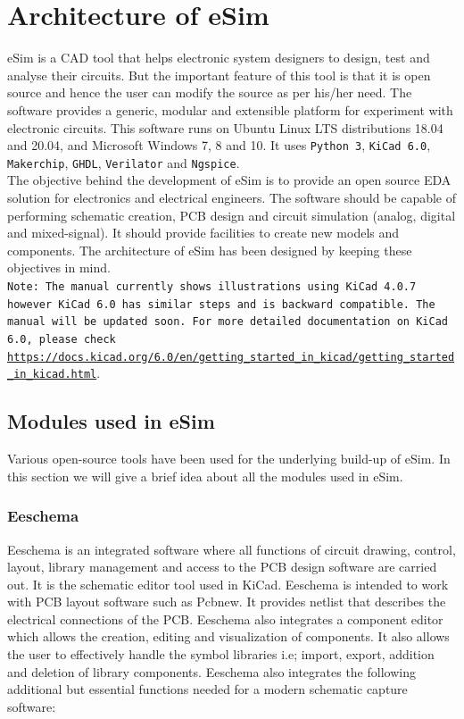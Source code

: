 
\chapter {Architecture of eSim}
\thispagestyle{empty}
\label{chap2}

eSim is a CAD  tool that helps electronic system designers
to design, test and analyse their circuits. But the important feature
of this tool is that it is open source and hence the user can modify
the source as per his/her need. The software provides a generic,
modular and extensible platform for experiment with electronic
circuits. This software runs on Ubuntu Linux LTS distributions 18.04 and 20.04, and  Microsoft Windows 7, 8 and 10.
It uses {\tt Python 3}, {\tt KiCad 6.0}, {\tt Makerchip},
{\tt GHDL}, {\tt Verilator} and {\tt Ngspice}.\\


The objective behind the development of eSim is to provide an open
source EDA solution for electronics and electrical engineers. The 
software should be capable of performing schematic creation, PCB 
design and circuit simulation (analog, digital and mixed-signal). 
It should provide facilities to create new models and components. 
The architecture of eSim has been designed by keeping these 
objectives in mind. \\

{\tt Note: The manual currently shows illustrations using KiCad 4.0.7 however KiCad 6.0 has similar steps and is backward compatible. The manual will be updated soon. For more detailed documentation on KiCad 6.0, please check \url{https://docs.kicad.org/6.0/en/getting_started_in_kicad/getting_started_in_kicad.html}}.

\section {Modules used in eSim}
Various open-source tools have been used for the underlying build-up 
of eSim. In this section we will give a brief idea about all the modules  
used in eSim. 

\subsection {Eeschema}  
Eeschema is an integrated software where all functions of circuit
drawing, control, layout, library management and access to the PCB
design software are carried out.  It is the schematic
editor tool used in KiCad. %
Eeschema is intended to
work with PCB layout software such as Pcbnew. It provides netlist that
describes the electrical connections of the PCB. Eeschema also
integrates a component editor which allows the creation, editing and
visualization of components. It also allows the user to effectively
handle the symbol libraries i.e; import, export, addition and deletion
of library components.  Eeschema also integrates the following
additional but essential functions needed for a modern schematic
capture software:

